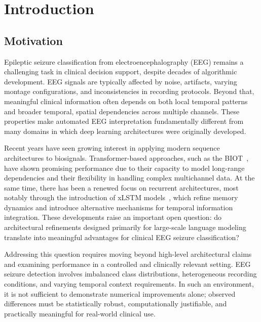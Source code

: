 \cleardoubleoddpage%
\chapter{Introduction}
\label{sec:introduction}


\section{Motivation}
\label{sec:introduction:motivation}

Epileptic seizure classification from electroencephalography (\ac{EEG}) remains a challenging task in clinical decision support, despite decades of algorithmic development. \ac{EEG} signals are typically affected by noise, artifacts, varying montage configurations, and inconsistencies in recording protocols. Beyond that, meaningful clinical information often depends on both local temporal patterns and broader temporal, spatial dependencies across multiple channels. These properties make automated \ac{EEG} interpretation fundamentally different from many domains in which deep learning architectures were originally developed.

Recent years have seen growing interest in applying modern sequence architectures to biosignals. Transformer-based approaches, such as the \acf{BIOT}~\cite{yang2023biot}, have shown promising performance due to their capacity to model long-range dependencies and their flexibility in handling complex multichannel data. At the same time, there has been a renewed focus on recurrent architectures, most notably through the introduction of \acf{xLSTM} models~\cite{beck2024xlstm}, which refine memory dynamics and introduce alternative mechanisms for temporal information integration. These developments raise an important open question: do architectural refinements designed primarily for large-scale language modeling translate into meaningful advantages for clinical \ac{EEG} seizure classification?

Addressing this question requires moving beyond high-level architectural claims and examining performance in a controlled and clinically relevant setting. \ac{EEG} seizure detection involves imbalanced class distributions, heterogeneous recording conditions, and varying temporal context requirements. In such an environment, it is not sufficient to demonstrate numerical improvements alone; observed differences must be statistically robust, computationally justifiable, and practically meaningful for real-world clinical use.


